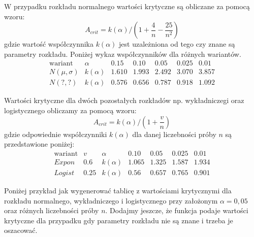 \documentclass[polish,]{book}
\begin{document}
W przypadku rozkładu normalnego wartości krytyczne są obliczane za pomocą wzoru:
\begin{equation}
A_{crit}=k(\alpha)/\left(1 + \frac{4}{n} - \frac{25}{n^2}\right)
\label{eq:v010}
\end{equation}
gdzie wartość współczynnika \(k(\alpha)\) jest uzależniona od tego czy znane są parametry rozkładu. Poniżej wykaz współczynników dla różnych wariantów.
\begin{equation}
\begin{array}{c|c|lllll}
  \mbox{wariant} & \alpha & 0.15 & 0.10 & 0.05 & 0.025 & 0.01\\
  \hline\hline
  N(\mu,\sigma) & k(\alpha) & 1.610 & 1.993 & 2.492 & 3.070 & 3.857\\
  N(?,?) & k(\alpha) & 0.576 & 0.656 & 0.787 & 0.918 & 1.092
 \end{array}
\label{eq:v011}
\end{equation}

Wartości krytyczne dla dwóch pozostałych rozkładów np. wykładniczegi oraz logistycznego obliczamy za pomocą wzoru:
\begin{equation}
A_{crit}=k(\alpha)/ \left(1 + \frac{v}{n}\right)
\label{eq:v011}
\end{equation}
gdzie odpowiednie współczynniki \(k(\alpha)\) dla danej liczebności próby \(n\) są przedstawione poniżej:
\begin{equation}
\begin{array}{c|l|c|llll}
  \mbox{wariant} & v & \alpha & 0.10 & 0.05 & 0.025 & 0.01\\
  \hline\hline
  Expon & 0.6 & k(\alpha) & 1.065 & 1.325 & 1.587 & 1.934\\
  Logist & 0.25 & k(\alpha) & 0.56 & 0.657 & 0.765 & 0.901
 \end{array}
\label{eq:v012}
\end{equation}

Poniżej przykład jak wygenerować tablicę z wartościami krytycznymi dla rozkładu normalnego, wykładniczego i logistycznego przy założonym \(\alpha=0,05\) oraz różnych liczebności próby \(n\). Dodajmy jeszcze, że funkcja podaje wartości krytyczne dla przypadku gdy parametry rozkładu nie są znane i trzeba je oszacować.
\end{document}
